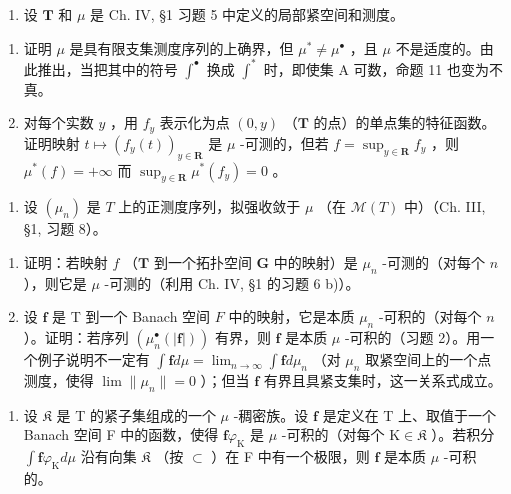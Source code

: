 \begin{enumerate}
\def\labelenumi{\arabic{enumi})}
\setcounter{enumi}{3}
\tightlist
\item
  设 \(\mathbf{T}\) 和 \(\mu\) 是 Ch. IV, §1 习题 5 中定义的局部紧空间和测度。
\end{enumerate}

\begin{enumerate}
\def\labelenumi{\alph{enumi})}
\item
  证明 \(\mu\) 是具有限支集测度序列的上确界，但 \(\mu^{*} \neq \mu^{\bullet}\) ，且 \(\mu\) 不是适度的。由此推出，当把其中的符号 \(\int^{\bullet}\) 换成 \(\int^{*}\) 时，即使集 A 可数，命题 11 也变为不真。
\item
  对每个实数 \(y\) ，用 \(f_y\) 表示化为点 \((0, y)\) （\(\mathbf{T}\) 的点）的单点集的特征函数。证明映射 \(t \mapsto (f_y(t))_{y \in \mathbf{R}}\) 是 \(\mu\) -可测的，但若 \(f = \sup_{y \in \mathbf{R}} f_y\) ，则 \(\mu^*(f) = +\infty\) 而 \(\sup_{y \in \mathbf{R}} \mu^*(f_y) = 0\) 。
\end{enumerate}

\begin{enumerate}
\def\labelenumi{\arabic{enumi})}
\setcounter{enumi}{4}
\tightlist
\item
  设 \((\mu_n)\) 是 \(T\) 上的正测度序列，拟强收敛于 \(\mu\) （在 \(\mathcal{M}(T)\) 中）（Ch. III, §1, 习题 8）。
\end{enumerate}

\begin{enumerate}
\def\labelenumi{\alph{enumi})}
\item
  证明：若映射 \(f\) （\(\mathbf{T}\) 到一个拓扑空间 \(\mathbf{G}\) 中的映射）是 \(\mu_n\) -可测的（对每个 \(n\) ），则它是 \(\mu\) -可测的（利用 Ch. IV, §1 的习题 6 b)）。
\item
  设 \(\mathbf{f}\) 是 T 到一个 Banach 空间 \(F\) 中的映射，它是本质 \(\mu_n\) -可积的（对每个 \(n\) ）。证明：若序列 \((\mu_n^\bullet (|\mathbf{f}|))\) 有界，则 \(\mathbf{f}\) 是本质 \(\mu\) -可积的（习题 2）。用一个例子说明不一定有 \(\int \mathbf{f} d\mu = \lim_{n\to \infty}\int \mathbf{f} d\mu_n\) （对 \(\mu_n\) 取紧空间上的一个点测度，使得 \(\lim \| \mu_n\| = 0\) ）；但当 \(\mathbf{f}\) 有界且具紧支集时，这一关系式成立。
\end{enumerate}

\begin{enumerate}
\def\labelenumi{\arabic{enumi})}
\setcounter{enumi}{5}
\tightlist
\item
  设 \(\mathfrak{K}\) 是 T 的紧子集组成的一个 \(\mu\) -稠密族。设 \(\mathbf{f}\) 是定义在 T 上、取值于一个 Banach 空间 F 中的函数，使得 \(\mathbf{f}\varphi_{\mathrm{K}}\) 是 \(\mu\) -可积的（对每个 \(\mathrm{K} \in \mathfrak{K}\) ）。若积分 \(\int \mathbf{f}\varphi_{\mathrm{K}} d\mu\) 沿有向集 \(\mathfrak{K}\) （按 \(\subset\) ）在 F 中有一个极限，则 \(\mathbf{f}\) 是本质 \(\mu\) -可积的。
\end{enumerate}

\setcounter{exercisegroup}{2}
\edef\CurrentExerciseGroup{\arabic{exercisegroup}}
